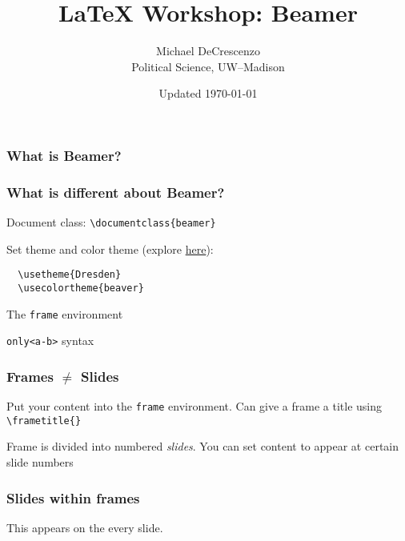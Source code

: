 \documentclass[10pt]{beamer}
\begin{document}
 


\begin{frame}[t]
  \title{{\LaTeX} Workshop: Beamer}
  \author{Michael DeCrescenzo \\ 
          Political Science, UW--Madison}
  \date{Updated \today}
  \titlepage
\end{frame}




\begin{frame}
\frametitle{What is Beamer?}
    
  \centering 



\end{frame}




\begin{frame}[fragile]
\frametitle{What is different about Beamer?}
    
Document class: \verb+\documentclass{beamer}+

Set theme and color theme (explore \href{https://mpetroff.net/files/beamer-theme-matrix/}{here}):
\begin{verbatim}
  \usetheme{Dresden}
  \usecolortheme{beaver}
\end{verbatim}

The \texttt{frame} environment

\texttt{only<a-b>} syntax

\end{frame}




\begin{frame}[fragile]\frametitle{Frames $\neq$ Slides}

  Put your content into the \texttt{frame} environment. Can give a frame a title using \verb+\frametitle{}+

  Frame is divided into numbered \emph{slides}. You can set content to appear at certain slide numbers

\end{frame}



\begin{frame}[t]\frametitle{Slides within frames}
    
  This appears on the every slide.
  
  
  
  

\end{frame}
\end{document}
